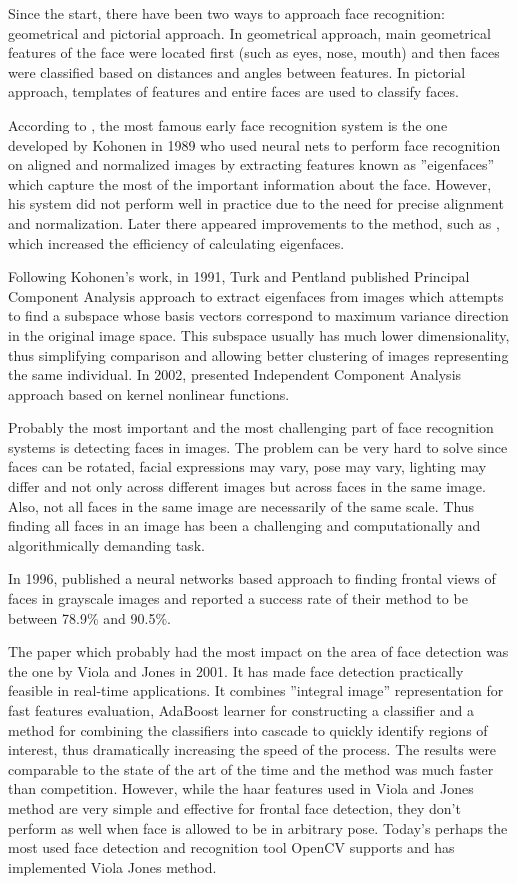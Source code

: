 \documentclass[11pt, draftclsnofoot, onecolumn]{IEEEtran}
\begin{document}
Since the start, there have been two ways to approach face recognition: geometrical and pictorial approach. In geometrical approach, main geometrical features of the face were located first (such as eyes, nose, mouth) and then faces were classified based on distances and angles between features. In pictorial approach, templates of features and entire faces are used to classify faces.

According to \cite{MIT2000}, the most famous early face recognition system is the one developed by Kohonen in 1989 who used neural nets to perform face recognition on aligned and normalized images by extracting features known as ''eigenfaces'' which capture the most of the important information about the face. However, his system did not perform well in practice due to the need for precise alignment and normalization. Later there appeared improvements to the method, such as \cite{IEEE1990}, which increased the efficiency of calculating eigenfaces.

Following Kohonen's work, in 1991, Turk and Pentland \cite{MIT1991} published Principal Component Analysis approach to extract eigenfaces from images which attempts to find a subspace whose basis vectors correspond to maximum variance direction in the original image space. This subspace usually has much lower dimensionality, thus simplifying comparison and allowing better clustering of images representing the same individual. In 2002, \cite{JMLR2002} presented Independent Component Analysis approach based on kernel nonlinear functions.

Probably the most important and the most challenging part of face recognition systems is detecting faces in images. The problem can be very hard to solve since faces can be rotated, facial expressions may vary, pose may vary, lighting may differ and not only across different images but across faces in the same image. Also, not all faces in the same image are necessarily of the same scale. Thus finding all faces in an image has been a challenging and computationally and algorithmically demanding task.

In 1996, \cite{CVPR1996} published a neural networks based approach to finding frontal views of faces in grayscale images and reported a success rate of their method to be between 78.9\% and 90.5\%.

The paper which probably had the most impact on the area of face detection was the one by Viola and Jones \cite{IWSCTV2001} in 2001. It has made face detection practically feasible in real-time applications. It combines ''integral image'' representation for fast features evaluation, AdaBoost learner for constructing a classifier and a method for combining the classifiers into cascade to quickly identify regions of interest, thus dramatically increasing the speed of the process. The results were comparable to the state of the art of the time and the method was much faster than competition. However, while the haar features used in Viola and Jones method are very simple and effective for frontal face detection, they don't perform as well when face is allowed to be in arbitrary pose. Today's perhaps the most used face detection and recognition tool OpenCV supports and has implemented Viola Jones method.
\end{document}

